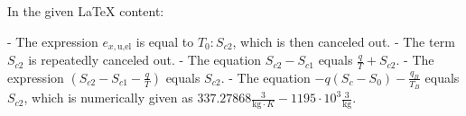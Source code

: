 In the given LaTeX content:

- The expression \( e_{x, \text{u,el}} \) is equal to \( T_0: S_{c2} \), which is then canceled out.
- The term \( S_{c2} \) is repeatedly canceled out.
- The equation \( S_{c2} - S_{c1} \) equals \( \frac{q}{T} + S_{c2} \).
- The expression \( \left( S_{c2} - S_{c1} - \frac{q}{T} \right) \) equals \( S_{c2} \).
- The equation \( - q \left( S_{c} - S_{0} \right) - \frac{q_B}{T_B} \) equals \( S_{c2} \), which is numerically given as \( 337.27868 \frac{3}{\text{kg} \cdot K} - 1195 \cdot 10^3 \frac{3}{\text{kg}} \).
